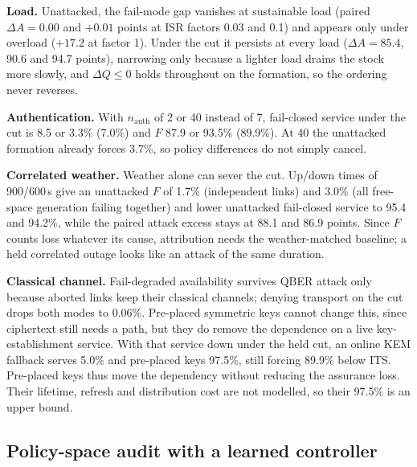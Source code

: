 \documentclass[conference,a4paper]{IEEEtran}
\begin{document}
\textbf{Load.} Unattacked, the fail-mode gap vanishes at sustainable load (paired
$\Delta A=0.00$ and $+0.01$ points at ISR factors 0.03 and 0.1) and appears only under
overload ($+17.2$ at factor 1). Under the cut it persists at every load ($\Delta
A=85.4$, 90.6 and 94.7 points), narrowing only because a lighter load drains the stock
more slowly, and $\Delta Q\le0$ holds throughout on the formation, so the ordering
never reverses.

\textbf{Authentication.} With $n_{\mathrm{auth}}$ of 2 or 40 instead of 7, fail-closed
service under the cut is 8.5 or 3.3\% (7.0\%) and $F$ 87.9 or 93.5\% (89.9\%). At 40
the unattacked formation already forces 3.7\%, so policy differences do not simply cancel.

\textbf{Correlated weather.} Weather alone can sever the cut. Up/down times of
900/600\,s give an unattacked $F$ of 1.7\% (independent links) and 3.0\% (all
free-space generation failing together) and lower unattacked fail-closed service to
95.4 and 94.2\%, while the paired attack excess stays at 88.1 and 86.9 points. Since
$F$ counts loss whatever its cause, attribution needs the weather-matched baseline; a
held correlated outage looks like an attack of the same duration.

\textbf{Classical channel.} Fail-degraded availability survives QBER attack only
because aborted links keep their classical channels; denying transport on the cut
drops both modes to 0.06\%. Pre-placed symmetric keys cannot change this, since
ciphertext still needs a path, but they do remove the dependence on a live
key-establishment service. With that service down under the held cut, an online KEM
fallback serves 5.0\% and pre-placed keys 97.5\%, still forcing 89.9\% below ITS.
Pre-placed keys thus move the dependency without reducing the assurance loss. Their
lifetime, refresh and distribution cost are not modelled, so their 97.5\% is an upper
bound.

\subsection{Policy-space audit with a learned controller}\label{sec:audit}
\begin{table}[t]
\caption{Learned grade controllers against the budget-greedy heuristic on the frozen
test set (seven conditions, twelve held-out seeds): paired differences, 95\%
intervals; $J$ in $10^{-3}$, others in points. $^\ast$Never below the floor; also the 24\,h nominal result.}
\label{tab:learn}
\centering\footnotesize
\setlength{\tabcolsep}{1.2pt}

\end{table}
\end{document}
